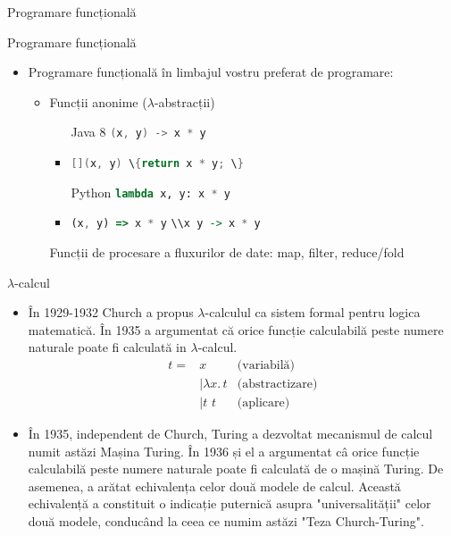 \documentclass[xcolor=pdftex,romanian,colorlinks]{beamer}
\begin{document}
\begin{section}{Programare funcțională}
\begin{frame}{Programare funcțională}
\begin{itemize}
\item Programare funcțională în limbajul vostru preferat de programare:
\begin{itemize}
\item Funcții anonime ($\lambda$-abstracții)
  \begin{itemize}
    \item[Java 8] \lstinline[language=java]$(x, y) -> x * y$
    \item[C++ 11] \lstinline[language=c++]$[](x, y) \{return x * y; \}$
    \item[Python] \lstinline[language=python]$lambda x, y: x * y$
    \item[JavaScript] \lstinline[language=javascript]$(x, y) => x * y$
    \vitem[Haskell] \lstinline[language=haskell]$\\x y -> x * y$
  \end{itemize}
\vitem Funcții de procesare a fluxurilor de date: map, filter, reduce/fold
\end{itemize}
\end{itemize}

%
%
\end{frame}

\begin{frame}{$\lambda$-calcul}

\begin{itemize}
\item În 1929-1932 Church a propus 
$\lambda$-calculul ca sistem formal pentru logica matematică.
În 1935 a argumentat că orice funcție calculabilă peste numere naturale poate
fi calculată in $\lambda$-calcul.
\[
 \begin{array}{lll}
t= &  x &  \mbox{(variabilă)} \\
 & \mid \lambda x.\, t & \mbox{(abstractizare)}\\
  & \mid t\,\, t & \mbox{(aplicare)}
\end{array}
\]
\item În 1935, independent de Church, Turing a dezvoltat mecanismul de calcul
numit astăzi Mașina Turing. 
În 1936 și el a argumentat câ orice funcție calculabilă peste numere naturale poate
fi calculată de o mașină Turing.
De asemenea, a arătat echivalența celor două modele de calcul.
Această echivalență a constituit o indicație puternică asupra "universalității" 
celor două modele, conducând la ceea ce numim astăzi "Teza Church-Turing".
\end{itemize}
\end{frame}


\end{section}
\end{document}
